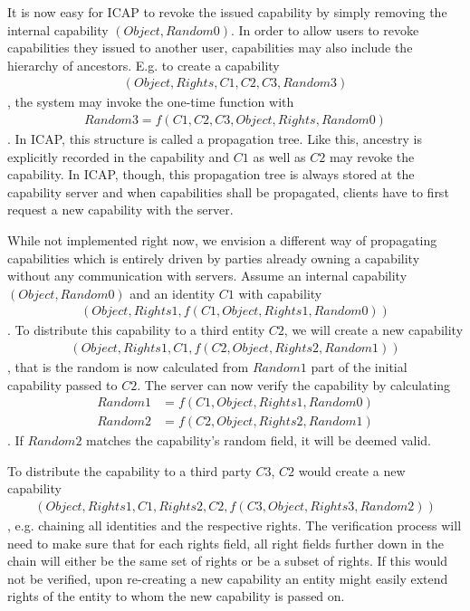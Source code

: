 It is now easy for ICAP to revoke the issued capability by simply removing the internal capability $(Object, Random0)$.
In order to allow users to revoke capabilities they issued to another user, capabilities may also include the hierarchy of ancestors.
E.g. to create a capability
\begin{align*}
    (Object, Rights, C1, C2, C3, Random3)
\end{align*},
the system may invoke the one-time function with
\begin{align*}
    Random3 = f(C1, C2, C3, Object, Rights, Random0)
\end{align*}.
In ICAP, this structure is called a propagation tree.
Like this, ancestry is explicitly recorded in the capability and $C1$ as well as $C2$ may revoke the capability.
In ICAP, though, this propagation tree is always stored at the capability server and when capabilities shall be propagated, clients have to first request a new capability with the server.

While not implemented right now, we envision a different way of propagating capabilities which is entirely driven by parties already owning a capability without any communication with servers.
Assume an internal capability $(Object, Random0)$ and an identity $C1$ with capability
\begin{align*}
    (Object, Rights1, f(C1, Object, Rights1, Random0))
\end{align*}.
To distribute this capability to a third entity $C2$, we will create a new capability
\begin{align*}
    (Object, Rights1, C1, f(C2, Object, Rights2, Random1))
\end{align*}, that is the random is now calculated from $Random1$ part of the initial capability passed to $C2$.
The server can now verify the capability by calculating
\begin{align*}
    Random1 &= f(C1, Object, Rights1, Random0)\\
    Random2 &= f(C2, Object, Rights2, Random1)
\end{align*}.
If $Random2$ matches the capability's random field, it will be deemed valid.

To distribute the capability to a third party $C3$, $C2$ would create a new capability
\begin{align*}
    (Object, Rights1, C1, Rights2, C2, f(C3, Object, Rights3, Random2))
\end{align*}, e.g. chaining all identities and the respective rights.
The verification process will need to make sure that for each rights field, all right fields further down in the chain will either be the same set of rights or be a subset of rights.
If this would not be verified, upon re-creating a new capability an entity might easily extend rights of the entity to whom the new capability is passed on.

